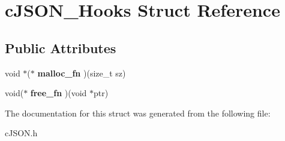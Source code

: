 \hypertarget{structc_j_s_o_n___hooks}{}\section{c\+J\+S\+O\+N\+\_\+\+Hooks Struct Reference}
\label{structc_j_s_o_n___hooks}
\subsection*{Public Attributes}
\begin{DoxyCompactItemize}
\item 
\mbox{\label{structc_j_s_o_n___hooks_a7f7cfcc2ea2d783405e6f4f6eab99ec7}} 
void $\ast$($\ast$ {\bfseries malloc\+\_\+fn} )(size\+\_\+t sz)
\item 
\mbox{\label{structc_j_s_o_n___hooks_a53e4e91f1e224c1e78c5d1fff7039372}} 
void($\ast$ {\bfseries free\+\_\+fn} )(void $\ast$ptr)
\end{DoxyCompactItemize}


The documentation for this struct was generated from the following file\+:\begin{DoxyCompactItemize}
\item 
c\+J\+S\+O\+N.\+h\end{DoxyCompactItemize}

